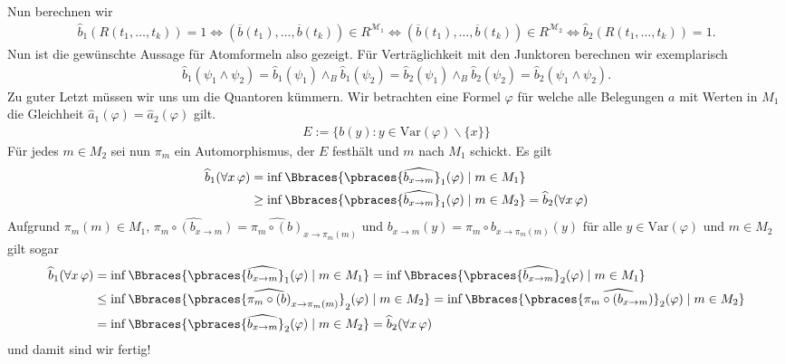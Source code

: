 \begin{solution}
	Nun berechnen wir
	\begin{align*}
	\widehat{b}_1(R(t_1, \dots, t_k)) = 1 \Leftrightarrow (\overline{b}(t_1), \dots, \overline{b}(t_k)) \in R^{\mathscr{M}_1} \Leftrightarrow  (\overline{b}(t_1), \dots, \overline{b}(t_k)) \in R^{\mathscr{M}_2} \Leftrightarrow \widehat{b}_2(R(t_1, \dots, t_k)) = 1.
	\end{align*}
	Nun ist die gewünschte Aussage für Atomformeln also gezeigt. Für Verträglichkeit mit den Junktoren berechnen wir exemplarisch
	\begin{align*}
	\widehat{b}_1(\psi_1 \land \psi_2) = \widehat{b}_1(\psi_1) \land_B \widehat{b}_1 (\psi_2) = \widehat{b}_2(\psi_1) \land_B \widehat{b}_2(\psi_2) = \widehat{b}_2(\psi_1 \land \psi_2).
	\end{align*}
	Zu guter Letzt müssen wir uns um die Quantoren kümmern. Wir betrachten eine Formel $\varphi$
  für welche alle Belegungen $a$ mit Werten in $M_1$ die Gleichheit
  $\hat{a}_1(\varphi) = \hat{a}_2(\varphi)$ gilt.
  \begin{align*}
    E := \{b(y): y \in \mathrm{Var}(\varphi)\backslash\{x\} \}
  \end{align*}
  Für jedes $m \in M_2$ sei nun $\pi_m$ ein Automorphismus, der $E$ festhält und $m$ nach $M_1$ schickt.
  Es gilt
  \begin{align*}
  \widehat{b}_1(\forall x\, \varphi) &=
  \inf\Bbraces{\pbraces{\widehat{b_{x \to  m}}}_1(\varphi) \mid m \in M_1} \\
  &\geq \inf\Bbraces{\pbraces{\widehat{b_{x \to  m}}}_1(\varphi) \mid m \in M_2}
  = \widehat{b}_2(\forall x\, \varphi)
  \end{align*}
  Aufgrund $\pi_m(m) \in M_1$,
  $\widehat{\pi_m \circ (b_{x \to  m})} = \widehat{\pi_m \circ (b)}_{x \to \pi_m(m)}$
  und $b_{x \to m}(y) = \pi_m \circ b_{x \to \pi_m(m)}(y)$ für alle $y \in \mathrm{Var}(\varphi)$
  und $m \in M_2$ gilt sogar
	\begin{align*}
	\widehat{b}_1(\forall x\, \varphi) &=
  \inf\Bbraces{\pbraces{\widehat{b_{x \to  m}}}_1(\varphi) \mid m \in M_1}
  = \inf\Bbraces{\pbraces{\widehat{b_{x \to  m}}}_2(\varphi) \mid m \in M_1} \\
	&\leq \inf\Bbraces{\pbraces{\widehat{\pi_m \circ (b)}_{x \to \pi_m(m)}}_2(\varphi) \mid m \in M_2}
  = \inf\Bbraces{\pbraces{\widehat{\pi_m \circ (b_{x \to  m})}}_2(\varphi) \mid m \in M_2}\\
	&= \inf\Bbraces{\pbraces{\widehat{b_{x \to  m}}}_2(\varphi) \mid m \in M_2}
  = \widehat{b}_2(\forall x\, \varphi)
	\end{align*}
	und damit sind wir fertig!
\end{solution}
